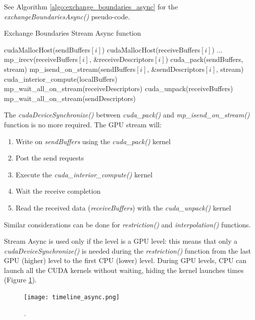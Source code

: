 \documentclass[conference]{IEEEtran}
\begin{document}
See Algorithm \ref{algo:exchange_boundaries_async} for the \textit{exchangeBoundariesAsync()} pseudo-code.

\begin{algorithm}
\small
\caption{Exchange Boundaries Stream Async function}
\label{algo:exchange_boundaries_async}
\begin{algorithmic}[1]
\State cudaMallocHost(sendBuffers$[i]$)
\State cudaMallocHost(receiveBuffers$[i]$)
\EndFor
\State ...
 \label{alg:b}
		\State mp\_irecv(receiveBuffers$[i]$, \&receiveDescriptors$[i]$)    
	\EndFor
	\State cuda\_pack(sendBuffers, stream)
		\State mp\_isend\_on\_stream(sendBuffers$[i]$, \&sendDescriptors$[i]$, stream)    
	\EndFor
	\State cuda\_interior\_compute(localBuffers)
	\State mp\_wait\_all\_on\_stream(receiveDescriptors)
	\State cuda\_unpack(receiveBuffers)
	\State mp\_wait\_all\_on\_stream(sendDescriptors)
\EndFunction
\end{algorithmic}
\end{algorithm}

The \textit{cudaDeviceSynchronize()} between \textit{cuda\_pack()} and \textit{mp\_isend\_on\_stream()} function is no more required. The GPU stream will:

\begin{enumerate}
\item Write on \textit{sendBuffers} using the \textit{cuda\_pack()} kernel
\item Post the send requests
\item Execute the \textit{cuda\_interior\_compute()} kernel
\item Wait the receive completion
\item Read the received data (\textit{receiveBuffers}) with the \textit{cuda\_unpack()} kernel
\end{enumerate}

Similar considerations can be done for \textit{restriction()} and \textit{interpolation()} functions.

Stream Async is used only if the level is a GPU level: this means that only a \textit{cudaDeviceSynchronize()} is needed during the \textit{restriction()} function from the last GPU (higher) level to the first CPU (lower) level. During GPU levels, CPU can launch all the CUDA kernels without waiting, hiding the kernel launches times (Figure \ref{fig:timeline_async}).

\begin{figure}[h]
\centering
\texttt{[image: timeline\_async.png]}
\caption{\textit{.}}
\label{fig:timeline_async}
\end{figure}
\end{document}
